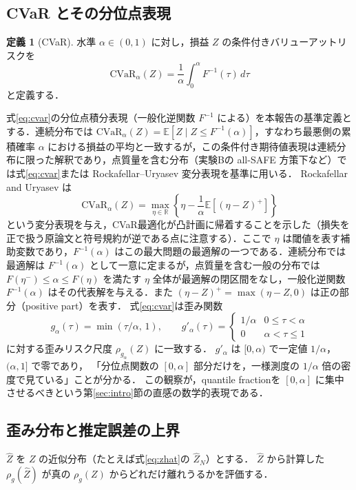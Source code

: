 \documentclass[a4paper,10pt]{jsarticle}
\theoremstyle{definition}
\newtheorem{definition}{定義}[section]
\newcommand{\CVaR}{\mathrm{CVaR}}
\newcommand{\Finv}{F^{-1}}
\newcommand{\R}{\mathbb{R}}
\newcommand{\E}{\mathbb{E}}
\begin{document}
\subsection{CVaR とその分位点表現}
\label{subsec:cvar}
\begin{definition}[CVaR]
水準 $\alpha\in(0,1)$ に対し，損益 $Z$ の条件付きバリューアットリスクを
\begin{equation}
  \CVaR_\alpha(Z)=\frac1\alpha\int_0^\alpha\Finv(\tau)\,d\tau
  \label{eq:cvar}
\end{equation}
と定義する．
\end{definition}
式\eqref{eq:cvar}の分位点積分表現（一般化逆関数 $\Finv$ による）を本報告の基準定義とする．連続分布では $\CVaR_\alpha(Z)=\E[Z\mid Z\le\Finv(\alpha)]$，すなわち最悪側の累積確率 $\alpha$ における損益の平均と一致するが，この条件付き期待値表現は連続分布に限った解釈であり，点質量を含む分布（実験Bの all-SAFE 方策下など）では式\eqref{eq:cvar}または Rockafellar--Uryasev 変分表現を基準に用いる．
Rockafellar and Uryasev \cite{rockafellar2000cvar} は
\begin{equation}
  \CVaR_\alpha(Z)=\max_{\eta\in\R}\left\{\eta-\frac1\alpha\E\left[(\eta-Z)^+\right]\right\}
\end{equation}
という変分表現を与え，CVaR最適化が凸計画に帰着することを示した（損失を正で扱う原論文と符号規約が逆である点に注意する）．ここで $\eta$ は閾値を表す補助変数であり，$\Finv(\alpha)$ はこの最大問題の最適解の一つである．連続分布では最適解は $\Finv(\alpha)$ として一意に定まるが，点質量を含む一般の分布では $F(\eta^-)\le\alpha\le F(\eta)$ を満たす $\eta$ 全体が最適解の閉区間をなし，一般化逆関数 $\Finv(\alpha)$ はその代表解を与える．また $(\eta-Z)^+=\max(\eta-Z,0)$ は正の部分（positive part）を表す．
式\eqref{eq:cvar}は歪み関数
\begin{equation}
  g_\alpha(\tau)=\min\left(\tau/\alpha,\,1\right),\qquad
  g'_\alpha(\tau)=\begin{cases}1/\alpha & 0\le\tau<\alpha\\ 0 & \alpha<\tau\le 1\end{cases}
  \label{eq:g-cvar}
\end{equation}
に対する歪みリスク尺度 $\rho_{g_\alpha}(Z)$ に一致する．
$g'_\alpha$ は $[0,\alpha)$ で一定値 $1/\alpha$，$(\alpha,1]$ で零であり，
「分位点関数の $[0,\alpha]$ 部分だけを，一様測度の $1/\alpha$ 倍の密度で見ている」ことが分かる．
この観察が，quantile fractionを $[0,\alpha]$ に集中させるべきという第\ref{sec:intro}節の直感の数学的表現である．

\subsection{歪み分布と推定誤差の上界}
\label{subsec:bound}
$\hat Z$ を $Z$ の近似分布（たとえば式\eqref{eq:zhat}の $\hat Z_N$）とする．
$\hat Z$ から計算した $\rho_g(\hat Z)$ が真の $\rho_g(Z)$ からどれだけ離れうるかを評価する．
\end{document}
